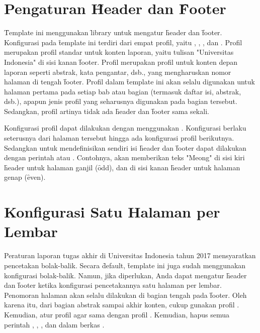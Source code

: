 \section{Pengaturan \f{Header} dan \f{Footer}}
\label{sec:fancyhdr}
\f{Template} ini menggunakan \f{library}  untuk mengatur \f{header} dan \f{footer}. Konfigurasi  pada \f{template} ini terdiri dari empat profil, yaitu , , , dan . Profil  merupakan profil standar untuk konten laporan, yaitu tulisan "Universitas Indonesia" di sisi kanan \f{footer}. Profil  merupakan profil untuk konten depan laporan seperti abstrak, kata pengantar, dsb., yang mengharuskan nomor halaman di tengah \f{footer}. Profil  dalam \f{template} ini akan selalu digunakan untuk halaman pertama pada setiap bab atau bagian (termasuk daftar isi, abstrak, dsb.), apapun jenis profil yang seharusnya digunakan pada bagian tersebut. Sedangkan, profil  artinya tidak ada \f{header} dan \f{footer} sama sekali.

Konfigurasi profil dapat dilakukan dengan menggunakan . Konfigurasi berlaku seterusnya dari halaman tersebut hingga ada konfigurasi profil berikutnya. Sedangkan untuk mendefinisikan sendiri isi \f{header} dan \f{footer} dapat dilakukan dengan perintah  atau . Contohnya,  akan memberikan teks "Meong" di sisi kiri \f{header} untuk halaman ganjil (\f{odd}), dan di sisi kanan \f{header} untuk halaman genap (\f{even}).


\section{Konfigurasi Satu Halaman per Lembar}
\label{sec:onePerSheet}
Peraturan laporan tugas akhir di Universitas Indonesia tahun 2017 mensyaratkan pencetakan bolak-balik. Secara \f{default}, \f{template} ini juga sudah menggunakan konfigurasi bolak-balik. Namun, jika diperlukan, Anda dapat mengatur \f{header} dan \f{footer} ketika konfigurasi pencetakannya satu halaman per lembar. Penomoran halaman akan selalu dilakukan di bagian tengah pada \f{footer}. Oleh karena itu, dari bagian abstrak sampai akhir konten, cukup gunakan profil . Kemudian, atur profil  agar sama dengan profil . Kemudian, hapus semua perintah , , , dan  dalam berkas .


